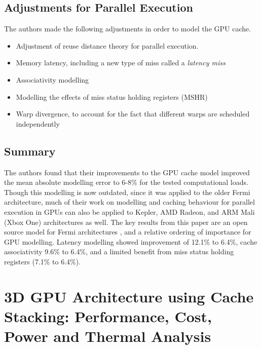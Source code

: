 \documentclass[conference]{IEEEtran}
\begin{document}
\subsection{Adjustments for Parallel Execution}
The authors made the following adjustments in order to model the GPU cache.
\begin{itemize}
    \item Adjustment of reuse distance theory for parallel execution.
    \item Memory latency, including a new type of miss called a 
        \emph{latency miss}
    \item Associativity modelling
    \item Modelling the effects of miss status holding registers (MSHR)
    \item Warp divergence, to account for the fact that different warps are 
        scheduled independently
\end{itemize}

\subsection{Summary}
The authors found that their improvements to the GPU cache model improved the
mean absolute modelling error to 6-8\% for the tested computational loads. 
Though this modelling is now outdated, since it was applied to the older Fermi
architecture, much of their work on modelling and caching behaviour for
parallel execution in GPUs can also be applied to Kepler, AMD Radeon, 
and ARM Mali (Xbox One) architectures as well. The key results from this paper
are an open source model for Fermi architectures \cite{gpumodel},
and a relative ordering of importance for GPU modelling. Latency modelling
showed improvement of 12.1\% to 6.4\%, cache associativity 9.6\% to 6.4\%,
and a limited benefit from miss status holding registers (7.1\% to 6.4\%).

\section{3D GPU Architecture using Cache Stacking: Performance, Cost, Power and
Thermal Analysis}
\end{document}
